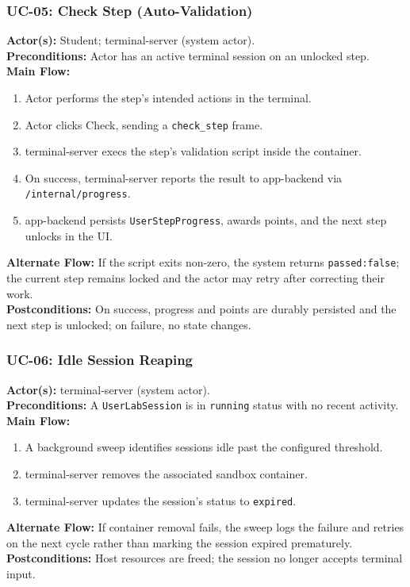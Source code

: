 \documentclass[11pt]{article}
\begin{document}
\subsubsection*{UC-05: Check Step (Auto-Validation)}
\textbf{Actor(s):} Student; terminal-server (system actor).\\
\textbf{Preconditions:} Actor has an active terminal session on an
unlocked step.\\
\textbf{Main Flow:}
\begin{enumerate}
\item Actor performs the step's intended actions in the terminal.
\item Actor clicks Check, sending a \texttt{check\_step} frame.
\item terminal-server execs the step's validation script inside the
      container.
\item On success, terminal-server reports the result to app-backend
      via \texttt{/internal/progress}.
\item app-backend persists \texttt{UserStepProgress}, awards points,
      and the next step unlocks in the UI.
\end{enumerate}
\textbf{Alternate Flow:} If the script exits non-zero, the system
returns \texttt{passed:false}; the current step remains locked and the
actor may retry after correcting their work.\\
\textbf{Postconditions:} On success, progress and points are durably
persisted and the next step is unlocked; on failure, no state changes.

\subsubsection*{UC-06: Idle Session Reaping}
\textbf{Actor(s):} terminal-server (system actor).\\
\textbf{Preconditions:} A \texttt{UserLabSession} is in
\texttt{running} status with no recent activity.\\
\textbf{Main Flow:}
\begin{enumerate}
\item A background sweep identifies sessions idle past the configured
      threshold.
\item terminal-server removes the associated sandbox container.
\item terminal-server updates the session's status to
      \texttt{expired}.
\end{enumerate}
\textbf{Alternate Flow:} If container removal fails, the sweep logs
the failure and retries on the next cycle rather than marking the
session expired prematurely.\\
\textbf{Postconditions:} Host resources are freed; the session no
longer accepts terminal input.
\end{document}
